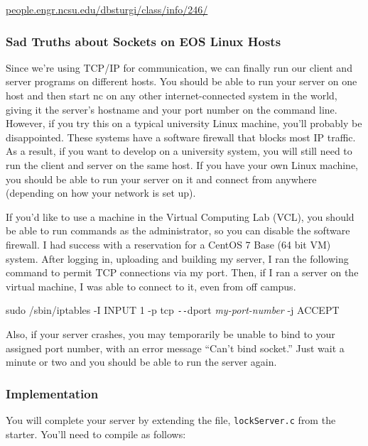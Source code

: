 \documentclass{article}
\begin{document}
\begin{enumerate}
\url{people.engr.ncsu.edu/dbsturgi/class/info/246/}
  
\subsubsection*{Sad Truths about Sockets on EOS Linux Hosts}

  Since we're using TCP/IP for communication, we can finally run our
  client and server programs on different hosts.  You should be able
  to run your server on one host and then start nc on any other
  internet-connected system in the world, giving it the server's
  hostname and your port number on the command line.  However, if you
  try this on a typical university Linux machine, you'll probably be
  disappointed.  These systems have a software firewall that blocks
  most IP traffic.  As a result, if you want to develop on a
  university system, you will still need to run the client and server
  on the same host.  If you have your own Linux machine, you should be
  able to run your server on it and connect from anywhere (depending
  on how your network is set up).

  If you'd like to use a machine in the Virtual Computing Lab (VCL),
  you should be able to run commands as the administrator, so you can
  disable the software firewall.  I had success with a reservation for a
  CentOS 7 Base (64 bit VM) system.  After logging in, uploading and building my
  server, I ran the following command to permit TCP connections via my
  port.  Then, if I ran a server on the virtual machine, I was
  able to connect to it, even from off campus.

\begin{tabbing}
sudo /sbin/iptables -I INPUT 1 -p tcp \verb+--+dport \textit{my-port-number} -j ACCEPT
\end{tabbing}

  Also, if your server crashes, you may temporarily be unable
  to bind to your assigned port number, with an error message ``Can't
  bind socket.''  Just wait a minute or two and you should be able to
  run the server again.

\subsubsection*{Implementation}

  You will complete your server by extending the file,
  \texttt{lockServer.c} from the starter.  You'll need to compile as
  follows:


\end{enumerate}
\end{document}
